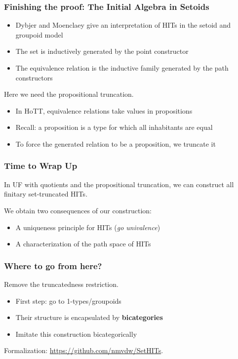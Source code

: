 \documentclass{beamer}
\begin{document}
\begin{frame}
\frametitle{Finishing the proof: The Initial Algebra in Setoids}
\begin{itemize}
	\item Dybjer and Moenclaey give an interpretation of HITs in the setoid and groupoid model
	\item The set is inductively generated by the point constructor
	\item The equivalence relation is the inductive family generated by the path constructors
\end{itemize}
Here we need the propositional truncation.
\begin{itemize}
	\item In HoTT, equivalence relations take values in propositions
	\item Recall: a proposition is a type for which all inhabitants are equal
	\item To force the generated relation to be a proposition, we truncate it
\end{itemize}
\end{frame}

\begin{frame}
\frametitle{Time to Wrap Up}
\begin{theorem}
In UF with quotients and the propositional truncation, we can construct all finitary set-truncated HITs.
\end{theorem}
We obtain two consequences of our construction:
\begin{itemize}
	\item A uniqueness principle for HITs (\emph{go univalence})
	\item A characterization of the path space of HITs
\end{itemize}
\end{frame}

\begin{frame}
\frametitle{Where to go from here?}
Remove the truncatedness restriction.
\begin{itemize}
	\item First step: go to 1-types/groupoids
	\item Their structure is encapsulated by \textbf{bicategories}
	\item Imitate this construction bicategorically
\end{itemize}
Formalization: \url{https://github.com/nmvdw/SetHITs}.
\end{frame}
\end{document}
